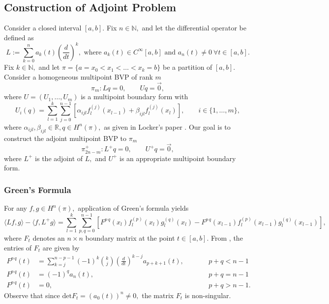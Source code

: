 \documentclass[11pt,reqno,oneside,a4paper]{article}
\theoremstyle{plain} %
\theoremstyle{definition}
\theoremstyle{remark}
\begin{document}
	
\subsection*{Construction of Adjoint Problem}
Consider a closed interval $[a,b].$ Fix $n\in\mathbb{N},$ and let the differential operator be defined as
\[ 
L  := \sum^n_{k=0} a_k(t)\left( \frac{d}{dt}\right)^k, \mbox{ where } a_k(t) \in C^{\infty}[a,b] \mbox{ and } a_n(t) \neq 0~ \forall t \in [a,b].
\]
Fix $k \in \mathbb{N},$ and let $\pi = \{ a = x_0 < x_1 < \ldots < x_k = b\}$ be a partition of $[a,b].$ Consider a homogeneous multipoint BVP of rank $m$
\[ \pi_m: Lq = 0, \qquad Uq = \vec{0},\]
where $U = (U_1, \ldots, U_m)$ is a multipoint boundary form with 
\[ 
U_i(q) = \sum^{k}_{l=1} \sum^{n-1}_{j=0}[\alpha_{ijl} f_l^{(j)}(x_{l-1}) + \beta_{ijl} f_l^{(j)}(x_{l})], \qquad i \in \{ 1, \ldots, m \}, 
\]
where $\alpha_{ijl}, \beta_{ijl} \in \mathbb{R}, q \in H^n(\pi),$ as given in Locker's paper \cite{locker}.
Our goal is to construct the adjoint multipoint BVP to $\pi_m$
\[ 
\pi^+_{2n-m}: L^+ q = 0, \qquad U^+q = \vec{0},
\] 
where $L^+$ is the adjoint of $L,$ and $U^+$ is an appropriate multipoint boundary form.
\subsubsection*{Green's Formula}
For any $f,g \in H^n(\pi),$ application of Green's formula yields
\[ \langle Lf,g\rangle - \langle f,L^+ g\rangle = \sum_{l=1}^{k}\sum_{p,q=0}^{n-1}[F^{p\,q}(x_l) f_l^{(p)}(x_l)g_l^{(q)}(x_l) - F^{p\,q}(x_{l-1})f_l^{(p)}(x_{l-1})g_l^{(q)}(x_{l-1})], \]
where $F_t$ denotes an $n\times n$ boundary matrix at the point $t \in [a,b].$ From \cite[p. 1286]{dunford}, the entries of $F_t$ are given by
\begin{equation*}
\begin{aligned}
F^{p\,q}(t) &= \sum^{n-p-1}_{k = j} (-1)^k \binom{k}{j} \left( \frac{d}{dt}\right)^{k-j} a_{p+k+1}(t), &&\qquad p + q< n - 1\\
F^{p\,q}(t) &= (-1)^q  a_{n}(t), &&\qquad p + q= n - 1\\
F^{p\,q}(t) &= 0, &&\qquad p + q > n - 1.
\end{aligned}
\end{equation*}
Observe that since $\mathrm{det}F_t = (a_0(t))^n \neq 0,$ the matrix $F_t$ is non-singular. 
\end{document}

